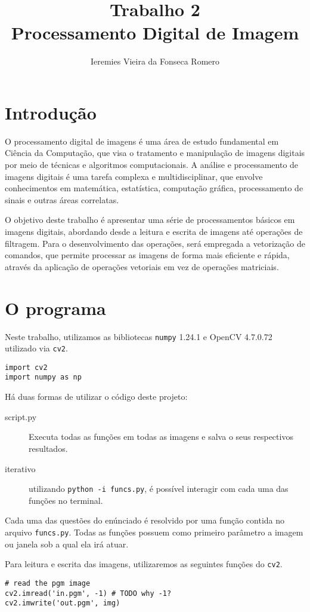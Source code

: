 \documentclass[twocolumn, 10pt]{article}
\author{Ieremies Vieira da Fonseca Romero}
\date{}
\title{Trabalho 2\\\medskip
\large Processamento Digital de Imagem}
\begin{document}
\maketitle


\section*{Introdução}
\label{sec:org0ec3531}
O processamento digital de imagens é uma área de estudo fundamental em Ciência da Computação, que visa o tratamento e manipulação de imagens digitais por meio de técnicas e algoritmos computacionais.
A análise e processamento de imagens digitais é uma tarefa complexa e multidisciplinar, que envolve conhecimentos em matemática, estatística, computação gráfica, processamento de sinais e outras áreas correlatas.

O objetivo deste trabalho é apresentar uma série de processamentos básicos em imagens digitais, abordando desde a leitura e escrita de imagens até operações de filtragem.
Para o desenvolvimento das operações, será empregada a vetorização de comandos, que permite processar as imagens de forma mais eficiente e rápida, através da aplicação de operações vetoriais em vez de operações matriciais.

\section*{O programa}
\label{sec:orgff38b50}
Neste trabalho, utilizamos as bibliotecas \texttt{numpy} 1.24.1 e OpenCV 4.7.0.72 utilizado via \texttt{cv2}.
\begin{verbatim}
import cv2
import numpy as np
\end{verbatim}

Há duas formas de utilizar o código deste projeto:
\begin{description}
\item[{script.py}] Executa todas as funções em todas as imagens e salva o seus respectivos resultados.
\item[{iterativo}] utilizando \texttt{python -i funcs.py}, é possível interagir com cada uma das funções no terminal.
\end{description}

Cada uma das questões do enúnciado é resolvido por uma função contida no arquivo \texttt{funcs.py}.
Todas as funções possuem como primeiro parâmetro a imagem ou janela sob a qual ela irá atuar.

Para leitura e escrita das imagens, utilizaremos as seguintes funções do \texttt{cv2}.
\begin{verbatim}
# read the pgm image
cv2.imread('in.pgm', -1) # TODO why -1?
cv2.imwrite('out.pgm', img)
\end{verbatim}
\end{document}
